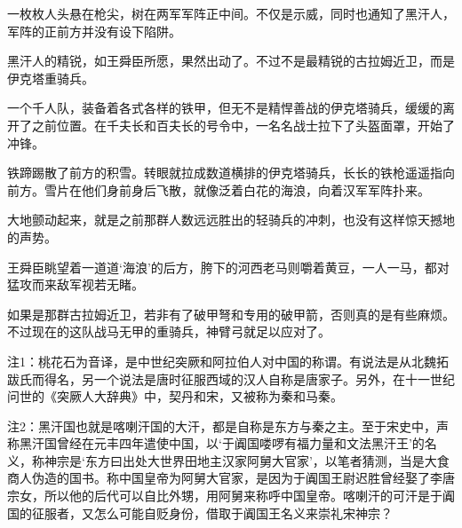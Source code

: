 一枚枚人头悬在枪尖，树在两军军阵正中间。不仅是示威，同时也通知了黑汗人，军阵的正前方并没有设下陷阱。

黑汗人的精锐，如王舜臣所愿，果然出动了。不过不是最精锐的古拉姆近卫，而是伊克塔重骑兵。

一个千人队，装备着各式各样的铁甲，但无不是精悍善战的伊克塔骑兵，缓缓的离开了之前位置。在千夫长和百夫长的号令中，一名名战士拉下了头盔面罩，开始了冲锋。

铁蹄踢散了前方的积雪。转眼就拉成数道横排的伊克塔骑兵，长长的铁枪遥遥指向前方。雪片在他们身前身后飞散，就像泛着白花的海浪，向着汉军军阵扑来。

大地颤动起来，就是之前那群人数远远胜出的轻骑兵的冲刺，也没有这样惊天撼地的声势。

王舜臣眺望着一道道‘海浪’的后方，胯下的河西老马则嚼着黄豆，一人一马，都对猛攻而来敌军视若无睹。

如果是那群古拉姆近卫，若非有了破甲弩和专用的破甲箭，否则真的是有些麻烦。不过现在的这队战马无甲的重骑兵，神臂弓就足以应对了。

注1：桃花石为音译，是中世纪突厥和阿拉伯人对中国的称谓。有说法是从北魏拓跋氏而得名，另一个说法是唐时征服西域的汉人自称是唐家子。另外，在十一世纪问世的《突厥人大辞典》中，契丹和宋，又被称为秦和马秦。

注2：黑汗国也就是喀喇汗国的大汗，都是自称是东方与秦之主。至于宋史中，声称黑汗国曾经在元丰四年遣使中国，以‘于阗国喽啰有福力量和文法黑汗王’的名义，称神宗是‘东方曰出处大世界田地主汉家阿舅大官家’，以笔者猜测，当是大食商人伪造的国书。称中国皇帝为阿舅大官家，是因为于阗国王尉迟胜曾经娶了李唐宗女，所以他的后代可以自比外甥，用阿舅来称呼中国皇帝。喀喇汗的可汗是于阗国的征服者，又怎么可能自贬身份，借取于阗国王名义来崇礼宋神宗？
